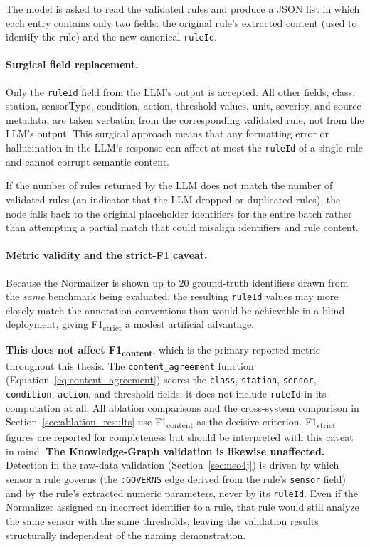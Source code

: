 ﻿\documentclass[11pt]{article}
\begin{document}
The model is asked to read the validated rules and produce a JSON list in which
each entry contains only two fields: the original rule's extracted content
(used to identify the rule) and the new canonical \texttt{ruleId}.

\paragraph{Surgical field replacement.}
Only the \texttt{ruleId} field from the LLM's output is accepted.  All other
fields, class, station, sensorType, condition, action, threshold values, unit,
severity, and source metadata, are taken verbatim from the corresponding
validated rule, not from the LLM's output.  This surgical approach means that
any formatting error or hallucination in the LLM's response can affect at most
the \texttt{ruleId} of a single rule and cannot corrupt semantic content.

If the number of rules returned by the LLM does not match the number of validated
rules (an indicator that the LLM dropped or duplicated rules), the node falls back
to the original placeholder identifiers for the entire batch rather than attempting
a partial match that could misalign identifiers and rule content.

\paragraph{Metric validity and the strict-F1 caveat.}
Because the Normalizer is shown up to 20 ground-truth identifiers drawn from the
\emph{same} benchmark being evaluated, the resulting \texttt{ruleId} values may
more closely match the annotation conventions than would be achievable in a blind
deployment, giving F1\textsubscript{strict} a modest artificial advantage.

\textbf{This does not affect F1\textsubscript{content}}, which is the primary
reported metric throughout this thesis.  The \texttt{content\_agreement} function
(Equation~\ref{eq:content_agreement}) scores the \texttt{class}, \texttt{station},
\texttt{sensor}, \texttt{condition}, \texttt{action}, and threshold fields; it does
not include \texttt{ruleId} in its computation at all.  All ablation comparisons
and the cross-system comparison in Section~\ref{sec:ablation_results} use
F1\textsubscript{content} as the decisive criterion.
F1\textsubscript{strict} figures are reported for completeness but should be
interpreted with this caveat in mind.
\textbf{The Knowledge-Graph validation is likewise unaffected.}
Detection in the raw-data validation (Section~\ref{sec:neo4j}) is driven by
which sensor a rule governs (the \texttt{:GOVERNS} edge derived from the
rule's \texttt{sensor} field) and by the rule's extracted numeric
parameters, never by its \texttt{ruleId}.
Even if the Normalizer assigned an incorrect identifier to a rule, that
rule would still analyze the same sensor with the same thresholds, leaving
the validation results structurally independent of the naming demonstration.
\end{document}
